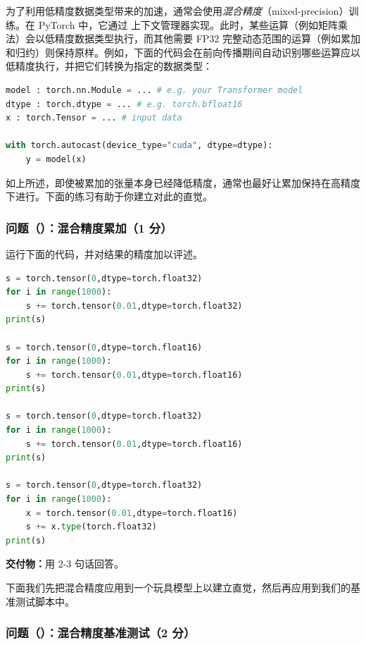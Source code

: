 为了利用低精度数据类型带来的加速，通常会使用\emph{混合精度}（mixed-precision）训练。在 PyTorch 中，它通过  上下文管理器实现。此时，某些运算（例如矩阵乘法）会以低精度数据类型执行，而其他需要 FP32 完整动态范围的运算（例如累加和归约）则保持原样。例如，下面的代码会在前向传播期间自动识别哪些运算应以低精度执行，并把它们转换为指定的数据类型：

\begin{lstlisting}[language=Python]
model : torch.nn.Module = ... # e.g. your Transformer model
dtype : torch.dtype = ... # e.g. torch.bfloat16
x : torch.Tensor = ... # input data

with torch.autocast(device_type="cuda", dtype=dtype):
    y = model(x)
\end{lstlisting}

如上所述，即使被累加的张量本身已经降低精度，通常也最好让累加保持在高精度下进行。下面的练习有助于你建立对此的直觉。

\subsubsection*{问题（）：混合精度累加（1 分）}

运行下面的代码，并对结果的精度加以评述。

\begin{lstlisting}[language=Python]
s = torch.tensor(0,dtype=torch.float32)
for i in range(1000):
    s += torch.tensor(0.01,dtype=torch.float32)
print(s)

s = torch.tensor(0,dtype=torch.float16)
for i in range(1000):
    s += torch.tensor(0.01,dtype=torch.float16)
print(s)

s = torch.tensor(0,dtype=torch.float32)
for i in range(1000):
    s += torch.tensor(0.01,dtype=torch.float16)
print(s)

s = torch.tensor(0,dtype=torch.float32)
for i in range(1000):
    x = torch.tensor(0.01,dtype=torch.float16)
    s += x.type(torch.float32)
print(s)
\end{lstlisting}

\textbf{交付物：}用 2-3 句话回答。

下面我们先把混合精度应用到一个玩具模型上以建立直觉，然后再应用到我们的基准测试脚本中。

\subsubsection*{问题（）：混合精度基准测试（2 分）}

